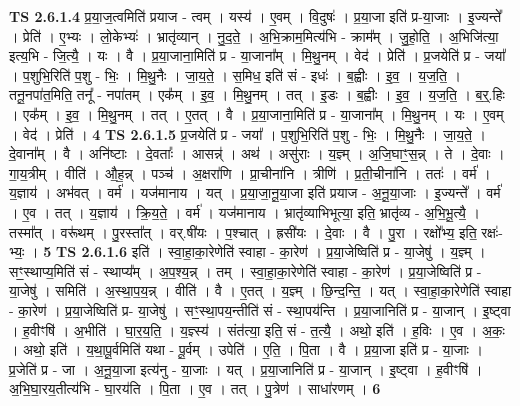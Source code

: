 \documentclass[17pt]{extarticle}
\begin{document}
                  \newline
                                \textbf{ TS 2.6.1.4} \newline
                  प्र॒या॒ज॒त्वमिति॑ प्रयाज - त्वम् । यस्य॑ । ए॒वम् । वि॒दुषः॑ । प्र॒या॒जा इति॑ प्र-या॒जाः । इ॒ज्यन्ते᳚ । प्रेति॑ । ए॒भ्यः । लो॒केभ्यः॑ । भ्रातृ॑व्यान् । नु॒द॒ते॒ । अ॒भि॒क्राम॒मित्य॑भि - क्राम᳚म् । जु॒हो॒ति॒ । अ॒भिजि॑त्या॒ इत्य॒भि - जि॒त्यै॒ । यः । वै । प्र॒या॒जाना॒मिति॑ प्र - या॒जाना᳚म् । मि॒थु॒नम् । वेद॑ । प्रेति॑ । प्र॒जयेति॑ प्र - जया᳚ । प॒शुभि॒रिति॑ प॒शु - भिः॒ । मि॒थु॒नैः । जा॒य॒ते॒ । स॒मिध॒ इति॑ सं - इधः॑ । ब॒ह्वीः । इ॒व॒ । य॒ज॒ति॒ । तनू॒नपा॑त॒मिति॒ तनू᳚ - नपा॑तम् । एक᳚म् । इ॒व॒ । मि॒थु॒नम् । तत् । इ॒डः । ब॒ह्वीः । इ॒व॒ । य॒ज॒ति॒ । ब॒र्॒.हिः । एक᳚म् । इ॒व॒ । मि॒थु॒नम् । तत् । ए॒तत् । वै । प्र॒या॒जाना॒मिति॑ प्र - या॒जाना᳚म् । मि॒थु॒नम् । यः । ए॒वम् । वेद॑ । प्रेति॑ । \textbf{  4} \newline
                  \newline
                                \textbf{ TS 2.6.1.5} \newline
                  प्र॒जयेति॑ प्र - जया᳚ । प॒शुभि॒रिति॑ प॒शु - भिः॒ । मि॒थु॒नैः । जा॒य॒ते॒ । दे॒वाना᳚म् । वै । अनि॑ष्टाः । दे॒वताः᳚ । आसन्न्॑ । अथ॑ । असु॑राः । य॒ज्ञ्म् । अ॒जि॒घाꣳ॒॒स॒न्न् । ते । दे॒वाः । गा॒य॒त्रीम् । वीति॑ । औ॒ह॒न्न् । पञ्च॑ । अ॒क्षरा॑णि । प्रा॒चीना॑नि । त्रीणि॑ । प्र॒ती॒चीना॑नि । ततः॑ । वर्म॑ । य॒ज्ञाय॑ । अभ॑वत् । वर्म॑ । यज॑मानाय । यत् । प्र॒या॒जा॒नू॒या॒जा इति॑ प्रयाज - अ॒नू॒या॒जाः । इ॒ज्यन्ते᳚ । वर्म॑ । ए॒व । तत् । य॒ज्ञाय॑ । क्रि॒य॒ते॒ । वर्म॑ । यज॑मानाय । भ्रातृ॑व्याभिभूत्या॒ इति॒ भ्रातृ॑व्य - अ॒भि॒भू॒त्यै॒ । तस्मा᳚त् । वरू॑थम् । पु॒रस्ता᳚त् । वर्.षी॑यः । प॒श्चात् । ह्रसी॑यः । दे॒वाः । वै । पु॒रा । रक्षो᳚भ्य॒ इति॒ रक्षः॑-भ्यः॒ । \textbf{  5} \newline
                  \newline
                                \textbf{ TS 2.6.1.6} \newline
                  इति॑ । स्वा॒हा॒का॒रेणेति॑ स्वाहा - का॒रेण॑ । प्र॒या॒जेष्विति॑ प्र - या॒जेषु॑ । य॒ज्ञ्म् । सꣳ॒॒स्थाप्य॒मिति॑ सं - स्थाप्य᳚म् । अ॒प॒श्य॒न्न् । तम् । स्वा॒हा॒का॒रेणेति॑ स्वाहा - का॒रेण॑ । प्र॒या॒जेष्विति॑ प्र - या॒जेषु॑ । समिति॑ । अ॒स्था॒प॒य॒न्न् । वीति॑ । वै । ए॒तत् । य॒ज्ञ्म् । छि॒न्द॒न्ति॒ । यत् । स्वा॒हा॒का॒रेणेति॑ स्वाहा - का॒रेण॑ । प्र॒या॒जेष्विति॑ प्र- या॒जेषु॑ । सꣳ॒॒स्था॒पय॒न्तीति॑ सं - स्था॒पय॑न्ति । प्र॒या॒जानिति॑ प्र - या॒जान् । इ॒ष्ट्वा । ह॒वीꣳषि॑ । अ॒भीति॑ । घा॒र॒य॒ति॒ । य॒ज्ञ्स्य॑ । संत॑त्या॒ इति॒ सं - त॒त्यै॒ । अथो॒ इति॑ । ह॒विः । ए॒व । अ॒कः॒ । अथो॒ इति॑ । य॒था॒पू॒र्वमिति॑ यथा - पू॒र्वम् । उपेति॑ । ए॒ति॒ । पि॒ता । वै । प्र॒या॒जा इति॑ प्र - या॒जाः । प्र॒जेति॑ प्र - जा । अ॒नू॒या॒जा इत्य॑नु - या॒जाः । यत् । प्र॒या॒जानिति॑ प्र - या॒जान् । इ॒ष्ट्वा । ह॒वीꣳषि॑ । अ॒भि॒घा॒रय॒तीत्य॑भि - घा॒रय॑ति । पि॒ता । ए॒व । तत् । पु॒त्रेण॑ । साधा॑रणम् । \textbf{  6} \newline
\end{document}
